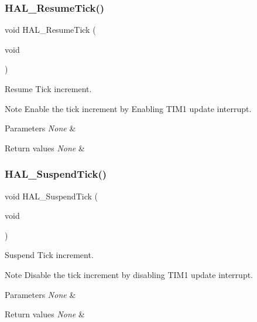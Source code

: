 \subsubsection{\texorpdfstring{H\+A\+L\+\_\+\+Resume\+Tick()}{HAL\_ResumeTick()}}
{\footnotesize\ttfamily void H\+A\+L\+\_\+\+Resume\+Tick (\begin{DoxyParamCaption}\item[{void}]{ }\end{DoxyParamCaption})}



Resume Tick increment. 

\begin{DoxyNote}{Note}
Enable the tick increment by Enabling T\+I\+M1 update interrupt. 
\end{DoxyNote}

\begin{DoxyParams}{Parameters}
{\em None} & \\
\hline
\end{DoxyParams}

\begin{DoxyRetVals}{Return values}
{\em None} & \\
\hline
\end{DoxyRetVals}
\mbox{\label{group___h_a_l___time_base_gaaf651af2afe688a991c657f64f8fa5f9}} 
\subsubsection{\texorpdfstring{H\+A\+L\+\_\+\+Suspend\+Tick()}{HAL\_SuspendTick()}}
{\footnotesize\ttfamily void H\+A\+L\+\_\+\+Suspend\+Tick (\begin{DoxyParamCaption}\item[{void}]{ }\end{DoxyParamCaption})}



Suspend Tick increment. 

\begin{DoxyNote}{Note}
Disable the tick increment by disabling T\+I\+M1 update interrupt. 
\end{DoxyNote}

\begin{DoxyParams}{Parameters}
{\em None} & \\
\hline
\end{DoxyParams}

\begin{DoxyRetVals}{Return values}
{\em None} & \\
\hline
\end{DoxyRetVals}
